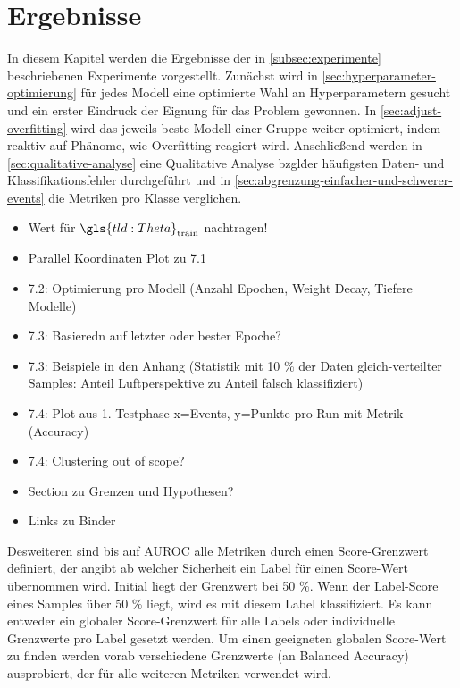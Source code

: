 \chapter{Ergebnisse}
\label{ch:results}

In diesem Kapitel werden die Ergebnisse der in \autoref{subsec:experimente} beschriebenen Experimente vorgestellt.
Zunächst wird in \autoref{sec:hyperparameter-optimierung} für jedes Modell eine optimierte Wahl an Hyperparametern gesucht und ein erster Eindruck der Eignung für das Problem gewonnen.
In \autoref{sec:adjust-overfitting} wird das jeweils beste Modell einer Gruppe weiter optimiert, indem reaktiv auf Phänome, wie Overfitting reagiert wird.
Anschließend werden in \autoref{sec:qualitative-analyse} eine Qualitative Analyse bzgl\. der häufigsten Daten- und Klassifikationsfehler durchgeführt und in \autoref{sec:abgrenzung-einfacher-und-schwerer-events} die Metriken pro Klasse verglichen.

\begin{tcolorbox}[title=Todo]
    \begin{itemize}
        \item Wert für $\gls{tld:Theta}_\text{train}$ nachtragen!
        \item Parallel Koordinaten Plot zu 7.1
        \item 7.2: Optimierung pro Modell (Anzahl Epochen, Weight Decay, Tiefere Modelle)
        \item 7.3: Basieredn auf letzter oder bester Epoche?
        \item 7.3: Beispiele in den Anhang (\zB Statistik mit 10 \% der Daten gleich-verteilter Samples: Anteil Luftperspektive zu Anteil falsch klassifiziert)
        \item 7.4: Plot aus 1. Testphase x=Events, y=Punkte pro Run mit Metrik (Accuracy)
        \item 7.4: Clustering out of scope?
        \item Section zu Grenzen und Hypothesen?
        \item Links zu Binder
    \end{itemize}

    Desweiteren sind bis auf AUROC alle Metriken durch einen Score-Grenzwert definiert, der angibt ab welcher Sicherheit ein Label für einen Score-Wert übernommen wird.
    Initial liegt der Grenzwert bei 50 \%.
    Wenn der Label-Score eines Samples über 50 \% liegt, wird es \ua mit diesem Label klassifiziert.
    Es kann entweder ein globaler Score-Grenzwert für alle Labels oder individuelle Grenzwerte pro Label gesetzt werden.
    Um einen geeigneten globalen Score-Wert zu finden werden vorab verschiedene Grenzwerte (an Balanced Accuracy) ausprobiert, der für alle weiteren Metriken verwendet wird.

\end{tcolorbox}

